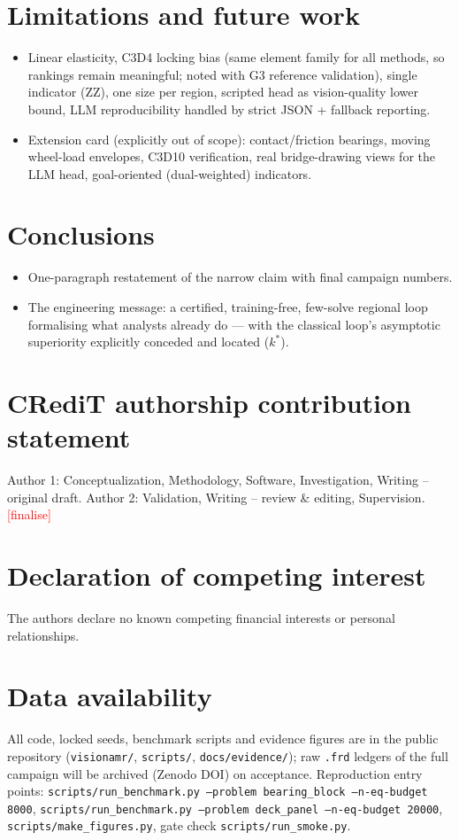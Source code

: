 \documentclass[preprint,12pt]{elsarticle}
\newcommand{\todo}[1]{\textcolor{red}{[#1]}}
\newenvironment{plan}{\begin{itemize}\setlength\itemsep{0.15em}}{\end{itemize}}
\begin{document}
\section{Limitations and future work}\label{sec:limits}
\begin{plan}
  \item Linear elasticity, C3D4 locking bias (same element family for all methods, so
        rankings remain meaningful; noted with G3 reference validation), single
        indicator (ZZ), one size per region, scripted head as vision-quality lower
        bound, LLM reproducibility handled by strict JSON + fallback reporting.
  \item Extension card (explicitly out of scope): contact/friction bearings, moving
        wheel-load envelopes, C3D10 verification, real bridge-drawing views for the
        LLM head, goal-oriented (dual-weighted) indicators.
\end{plan}

\section{Conclusions}\label{sec:concl}
\begin{plan}
  \item One-paragraph restatement of the narrow claim with final campaign numbers.
  \item The engineering message: a certified, training-free, few-solve regional loop
        formalising what analysts already do --- with the classical loop's asymptotic
        superiority explicitly conceded and located ($k^*$).
\end{plan}

\section*{CRediT authorship contribution statement}\label{sec:credit}
Author 1: Conceptualization, Methodology, Software, Investigation, Writing -- original
draft. Author 2: Validation, Writing -- review \& editing, Supervision. \todo{finalise}

\section*{Declaration of competing interest}
The authors declare no known competing financial interests or personal relationships.

\section*{Data availability}\label{sec:data}
All code, locked seeds, benchmark scripts and evidence figures are in the public
repository (\texttt{visionamr/}, \texttt{scripts/}, \texttt{docs/evidence/});
raw \texttt{.frd} ledgers of the full campaign will be archived (Zenodo DOI)
on acceptance. Reproduction entry points:
\texttt{scripts/run\_benchmark.py --problem bearing\_block --n-eq-budget 8000},
\texttt{scripts/run\_benchmark.py --problem deck\_panel --n-eq-budget 20000},
\texttt{scripts/make\_figures.py}, gate check \texttt{scripts/run\_smoke.py}.
\end{document}
